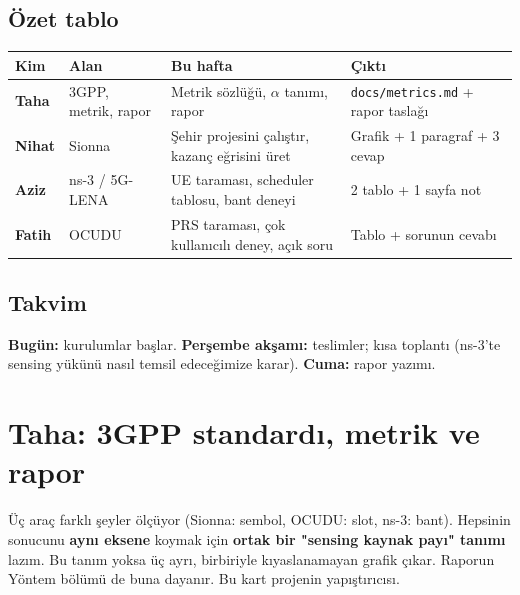 \documentclass[10.5pt,a4paper]{article}
\begin{document}
\subsection*{Özet tablo}
\begingroup\sffamily\small
\begin{xltabular}{\textwidth}{@{}p{1.5cm}p{2.7cm}Xp{3.6cm}@{}}
\toprule
\textbf{Kim} & \textbf{Alan} & \textbf{Bu hafta} & \textbf{Çıktı} \\
\midrule
\textbf{Taha} & 3GPP, metrik, rapor & Metrik sözlüğü, $\alpha$ tanımı, rapor & \texttt{docs/metrics.md} + rapor taslağı \\
\textbf{Nihat} & Sionna & Şehir projesini çalıştır, kazanç eğrisini üret & Grafik + 1 paragraf + 3 cevap \\
\textbf{Aziz} & ns-3 / 5G-LENA & UE taraması, scheduler tablosu, bant deneyi & 2 tablo + 1 sayfa not \\
\textbf{Fatih} & OCUDU & PRS taraması, çok kullanıcılı deney, açık soru & Tablo + sorunun cevabı \\
\bottomrule
\end{xltabular}
\endgroup

\subsection*{Takvim}
\textbf{Bugün:} kurulumlar başlar. \textbf{Perşembe akşamı:} teslimler; kısa toplantı (ns-3'te sensing yükünü nasıl temsil edeceğimize karar). \textbf{Cuma:} rapor yazımı.

\clearpage
\section*{Taha: 3GPP standardı, metrik ve rapor}
\begin{neden}
Üç araç farklı şeyler ölçüyor (Sionna: sembol, OCUDU: slot, ns-3: bant). Hepsinin sonucunu \textbf{aynı eksene} koymak için \textbf{ortak bir "sensing kaynak payı" tanımı} lazım. Bu tanım yoksa üç ayrı, birbiriyle kıyaslanamayan grafik çıkar. Raporun Yöntem bölümü de buna dayanır. Bu kart projenin yapıştırıcısı.
\end{neden}
\end{document}
